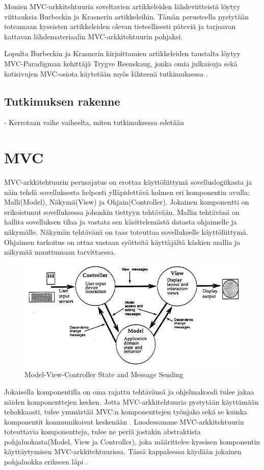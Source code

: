 \documentclass[finnish,utf8,nonumbib,palatino,kandi]{gradu2}
\begin{document}
Monien MVC-arkkitehtuuria soveltavien artikkeleiden lähdeviitteistä löytyy viittauksia Burbeckin ja Krasnerin artikkeleihin. Tämän perusteella pystytään
toteamaan kyseisten artikkeleiden olevan tieteellisesti päteviä ja tarjoavan kattavan lähdemateriaalin MVC-arkkitehtuurin pohjaksi. 

Lopulta Burbeckin ja Krasnerin kirjoittamien artikkeleiden taustalta löytyy MVC-Paradigman kehittäjä Trygve Reenskaug, jonka omia julkaisuja sekä kotisivujen MVC-osiota
käytetään myös lähteenä tutkimuksessa \cite{Reenskaug}. 

\subsection {Tutkimuksen rakenne}
- Kerrotaan vaihe vaiheelta, miten tutkimuksessa edetään

\section {MVC}
MVC-arkkitehtuurin perusajatus on erottaa käyttöliittymä sovelluslogiikasta ja 
näin tehdä sovelluksesta helposti ylläpidettävä kolmen eri komponentin avulla: 
Malli(Model), Näkymä(View) ja Ohjain(Controller). Jokainen komponentti on 
erikoistunut sovelluksessa johonkin tiettyyn tehtävään. Mallin tehtävänä on 
hallita sovelluksen tilaa ja vastata sen käsittelemästä datasta ohjaimelle ja näkymälle.
Näkymän tehtävänä on taas toteuttaa sovellukselle käyttöliittymä. Ohjaimen tarkoitus on ottaa
vastaan syötteitä käyttäjältä käskien mallia ja näkymää muuttumaan tarvittaessa.  

\begin{figure}[h]
\centering
\includegraphics[scale=0.85]{krasner_mvc.jpg}
\caption{Model-View-Controller State and Message Sending \cite{Krasner:desc}}
\end{figure}

Jokaisella komponentilla on oma rajattu tehtävänsä ja ohjelmakoodi tulee jakaa näiden komponenttejen kesken. Jotta MVC-arkkitehtuuria pystytään käyttämään 
tehokkaasti, tulee ymmärtää MVC:n komponenttejen työnjako sekä se kuinka komponentit kommunikoivat keskenään \cite{Burbeck}.  Luodessamme MVC-arkkitehtuurin
toteuttavia komponentteja, tulee ne periä jostakin abstraktista pohjaluokasta(Model, View ja Controller), joka määrittelee kyseisen komponentin käyttäytymisen MVC-arkkitehtuurissa.  Tässä kappaleessa käydään jokainen pohjaluokka erikseen läpi \cite{Krasner:desc}. 
\end{document}
